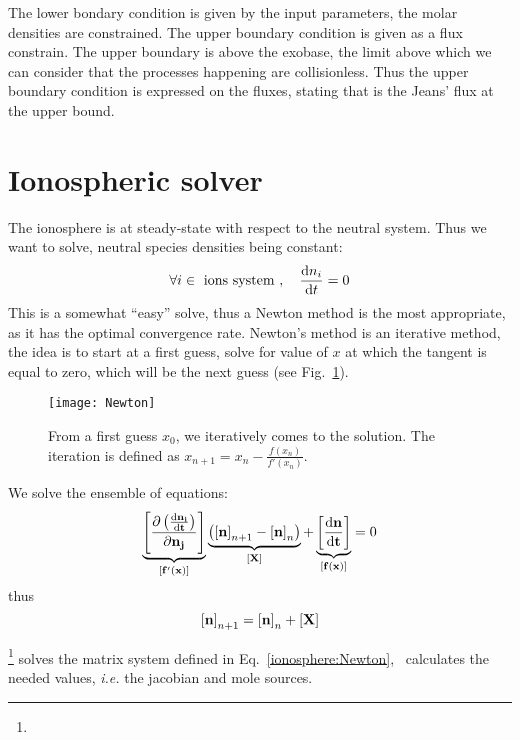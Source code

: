 The lower bondary condition is given by the input parameters, the molar densities
are constrained. The upper boundary condition is given as a flux constrain. The
upper boundary is above the exobase, the limit above which we can consider that
the processes happening are collisionless. Thus the upper boundary condition
is expressed on the fluxes, stating that \doverdz{\conc} is the Jeans' flux
at the upper bound.

\section{Ionospheric solver}

The ionosphere is at steady-state with respect to the
neutral system. Thus we want to solve, neutral species
densities being constant:
\begin{equation}
\forall i \in \text{ ions system },\quad \frac{\mathrm{d} n_i}{\mathrm{d} t} = 0
\label{ionosphere:steady_state}
\end{equation}
%
This is a somewhat ``easy'' solve, thus a Newton method is the
most appropriate, as it has the optimal convergence rate.
Newton's method is an iterative method, the idea is to start
at a first guess, solve for value of $x$ at which the tangent is
equal to zero, which will be the next guess (see Fig.~\ref{Newton:solve}).
\begin{figure}
\centering
\texttt{[image: Newton]}
\caption{\label{Newton:solve}From a first guess $x_0$, we iteratively
comes to the solution. The iteration is defined as $x_{n+1} = x_n - \frac{f(x_n)}{f'(x_n)}$.}
\end{figure}
We solve the ensemble of equations:
\begin{equation}
\underbrace{\left[\mathbf{\frac{\partial\left(\frac{\mathrm{d} n_i}{\mathrm{d} t}\right)}{\partial n_j}}\right]}_{\left[\mathbf{f'(x)}\right]} 
                \underbrace{\left(\left[\mathbf{n}\right]_{n+1} - \left[\mathbf{n}\right]_n\right)}_{\left[\mathbf{X}\right]} + 
                \underbrace{\left[\mathbf{\frac{\mathrm{d} n}{\mathrm{d} t}}\right]}_{\left[\mathbf{f(x)}\right]} = 0
\label{ionosphere:Newton}
\end{equation}
thus
\begin{equation}
\left[\mathbf{n}\right]_{n+1} = \left[\mathbf{n}\right]_n + \left[\mathbf{X}\right]
\label{ionosphere:Newton:iter}
\end{equation}

\Eigen\footnote{\EigenTux} solves the matrix system defined in Eq.~\ref{ionosphere:Newton}, \PINC\ calculates
the needed values, \textit{i.e.} the jacobian and mole sources.
